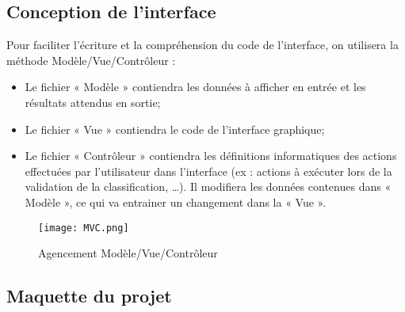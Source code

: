\subsection{Conception de l'interface}

Pour faciliter l’écriture et la compréhension du code de l’interface, on utilisera la méthode Modèle/Vue/Contrôleur :

\begin{itemize}[label=$\rightarrow$]
	\item Le fichier « Modèle » contiendra les données à afficher en entrée et les résultats attendus en sortie;
	\item Le fichier « Vue » contiendra le code de l’interface graphique;
	\item Le fichier « Contrôleur » contiendra les définitions informatiques des actions effectuées par l’utilisateur dans l’interface (ex : actions à exécuter lors de la validation de la classification, …). Il modifiera les données contenues dans « Modèle », ce qui va entrainer un changement dans la « Vue ».
\end{itemize}

\begin{figure}[!h]
	\begin{center}
		\texttt{[image: MVC.png]}  \\
		\caption[Agencement Modèle/Vue/Contrôleur]{Agencement Modèle/Vue/Contrôleur}
		\label{fig:MVC}
	\end{center}
\end{figure}

\subsection{Maquette du projet}




